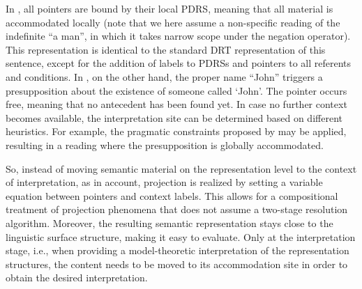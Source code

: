 \noindent In \Last[a], all pointers are bound by their local PDRS, meaning
that all material is accommodated locally (note that we here assume
a non-specific reading of the indefinite ``a man'', in which it takes narrow
scope under the negation operator).  This representation is identical to the
standard DRT representation of this sentence, except for the addition of
labels to PDRSs and pointers to all referents and conditions. In \Last[b],
on the other hand, the proper name ``John'' triggers a presupposition about
the existence of someone called `John'. The pointer occurs free, meaning
that no antecedent has been found yet. In case no further context becomes
available, the interpretation site can be determined based on different
heuristics. For example, the pragmatic constraints proposed by
 may be applied, resulting in a reading
where the presupposition is globally accommodated. 


So, instead of moving semantic material on the representation level to the
context of interpretation, as in  account,
projection is realized by setting a variable equation between pointers and
context labels.  This allows for a compositional treatment of projection
phenomena that does not assume a two-stage resolution algorithm.  Moreover,
the resulting semantic representation stays close to the linguistic
surface structure, making it easy to evaluate.  Only at the interpretation
stage, i.e., when providing a model-theoretic interpretation of the
representation structures, the content needs to be moved to its
accommodation site in order to obtain the desired interpretation.



